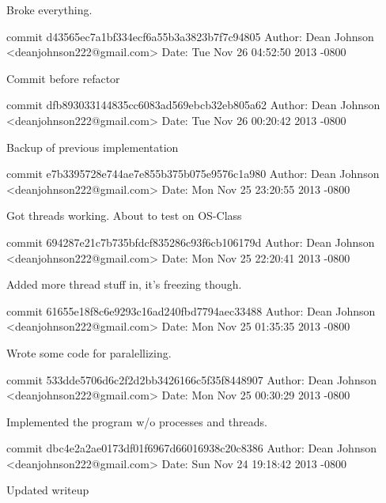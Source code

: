 \documentclass[fleqn,10pt,titlepage]{article}
\begin{document}
    Broke everything.

commit d43565ec7a1bf334ecf6a55b3a3823b7f7c94805
Author: Dean Johnson <deanjohnson222@gmail.com>
Date:   Tue Nov 26 04:52:50 2013 -0800

    Commit before refactor

commit dfb893033144835cc6083ad569ebcb32eb805a62
Author: Dean Johnson <deanjohnson222@gmail.com>
Date:   Tue Nov 26 00:20:42 2013 -0800

    Backup of previous implementation

commit e7b3395728e744ae7e855b375b075e9576c1a980
Author: Dean Johnson <deanjohnson222@gmail.com>
Date:   Mon Nov 25 23:20:55 2013 -0800

    Got threads working. About to test on OS-Class

commit 694287e21c7b735bfdcf835286c93f6cb106179d
Author: Dean Johnson <deanjohnson222@gmail.com>
Date:   Mon Nov 25 22:20:41 2013 -0800

    Added more thread stuff in, it's freezing though.

commit 61655e18f8c6e9293c16ad240fbd7794aec33488
Author: Dean Johnson <deanjohnson222@gmail.com>
Date:   Mon Nov 25 01:35:35 2013 -0800

    Wrote some code for paralellizing.

commit 533dde5706d6c2f2d2bb3426166c5f35f8448907
Author: Dean Johnson <deanjohnson222@gmail.com>
Date:   Mon Nov 25 00:30:29 2013 -0800

    Implemented the program w/o processes and threads.

commit dbc4e2a2ae0173df01f6967d66016938c20c8386
Author: Dean Johnson <deanjohnson222@gmail.com>
Date:   Sun Nov 24 19:18:42 2013 -0800

    Updated writeup

\clearpage
\end{document}
